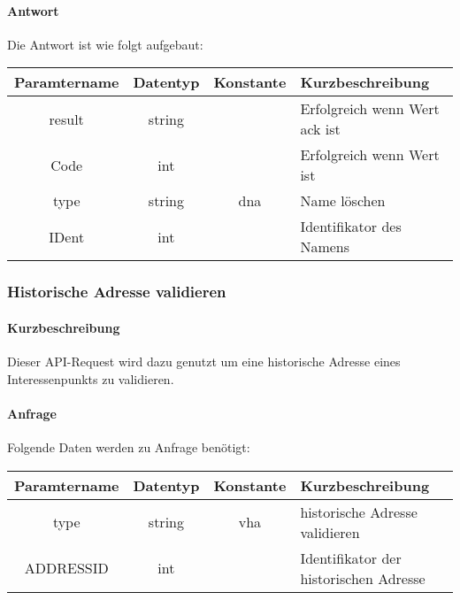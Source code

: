 \paragraph{Antwort}Die Antwort ist wie folgt aufgebaut:
\begin{table}[H]
	\begin{tabular}{|c|c|c|p{6.5cm}|}
		\hline
		\textbf{Paramtername} & \textbf{Datentyp} & \textbf{Konstante} & \textbf{Kurzbeschreibung}                                                                                               \\ \hline
		result              & string           &                 & Erfolgreich wenn Wert {\glqq ack\grqq} ist \\ \hline
		Code                & int              &                 & Erfolgreich wenn Wert {\glqq 0\grqq} ist \\ \hline
		type                & string           & dna             & Name löschen \\ \hline
		IDent               & int              &                 & Identifikator des Namens \\ \hline
	\end{tabular}
\end{table}
\subsubsection{Historische Adresse validieren}
\paragraph{Kurzbeschreibung}Dieser API-Request wird dazu genutzt um eine historische Adresse eines Interessenpunkts zu validieren.
\paragraph{Anfrage}Folgende Daten werden zu Anfrage benötigt:
\begin{table}[H]
	\begin{tabular}{|c|c|c|p{6.5cm}|}
		\hline
		\textbf{Paramtername} & \textbf{Datentyp} & \textbf{Konstante} & \textbf{Kurzbeschreibung}                                                                                               \\ \hline
		type                & string            & vha                & historische Adresse validieren \\ \hline
		ADDRESSID           & int               &                    & Identifikator der historischen Adresse \\ \hline
	\end{tabular}
\end{table}
